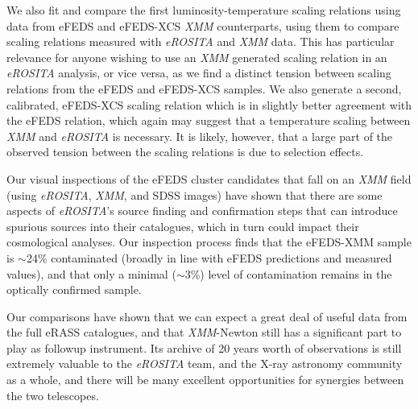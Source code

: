 \documentclass[fleqn,usenatbib]{mnras}
\begin{document}
We also fit and compare the first luminosity-temperature scaling relations using data from eFEDS and eFEDS-XCS {\em XMM} counterparts, using them to compare scaling relations measured with {\em eROSITA} and {\em XMM} data. This has particular relevance for anyone wishing to use an {\em XMM} generated scaling relation in an {\em eROSITA} analysis, or vice versa, as we find a distinct tension between scaling relations from the eFEDS and eFEDS-XCS samples. We also generate a second, calibrated, eFEDS-XCS scaling relation which is in slightly better agreement with the eFEDS relation, which again may suggest that a temperature scaling between {\em XMM} and {\em eROSITA} is necessary. It is likely, however, that a large part of the observed tension between the scaling relations is due to selection effects.

Our visual inspections of the eFEDS cluster candidates that fall on an {\em XMM} field (using {\em eROSITA}, {\em XMM}, and SDSS images) have shown that there are some aspects of {\em eROSITA}'s source finding and confirmation steps that can introduce spurious sources into their catalogues, which in turn could impact their cosmological analyses. Our inspection process finds that the eFEDS-XMM sample is ${\sim}$24\% contaminated (broadly in line with eFEDS predictions and measured values), and that only a minimal (${\sim}$3\%) level of contamination remains in the optically confirmed sample.

Our comparisons have shown that we can expect a great deal of useful data from the full eRASS catalogues, and that {\em XMM}-Newton still has a significant part to play as followup instrument. Its archive of 20 years worth of observations is still extremely valuable to the {\em eROSITA} team, and the X-ray astronomy community as a whole, and there will be many excellent opportunities for synergies between the two telescopes.

\end{document}
